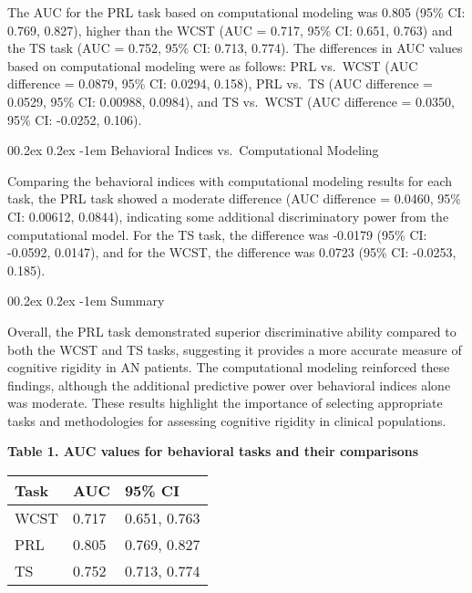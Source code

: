 \documentclass[
  man]{apa6}
\makeatletter
\let\oldparagraph\paragraph
\renewcommand{\paragraph}{
    \@ifstar
      \xxxParagraphStar
      \xxxParagraphNoStar
  }
\newcommand{\xxxParagraphStar}[1]{\oldparagraph*{#1}\mbox{}}
\newcommand{\xxxParagraphNoStar}[1]{\oldparagraph{#1}\mbox{}}
\renewcommand{\paragraph}{\@startsection{paragraph}{4}{\parindent}%
  {0\baselineskip \@plus 0.2ex \@minus 0.2ex}%
  {-1em}%
  {\normalfont\normalsize\bfseries\itshape\typesectitle}}
\makeatother
\begin{document}
The AUC for the PRL task based on computational modeling was 0.805 (95\% CI: 0.769, 0.827), higher than the WCST (AUC = 0.717, 95\% CI: 0.651, 0.763) and the TS task (AUC = 0.752, 95\% CI: 0.713, 0.774). The differences in AUC values based on computational modeling were as follows: PRL vs.~WCST (AUC difference = 0.0879, 95\% CI: 0.0294, 0.158), PRL vs.~TS (AUC difference = 0.0529, 95\% CI: 0.00988, 0.0984), and TS vs.~WCST (AUC difference = 0.0350, 95\% CI: -0.0252, 0.106).

\paragraph{Behavioral Indices vs.~Computational Modeling}\label{behavioral-indices-vs.-computational-modeling}

Comparing the behavioral indices with computational modeling results for each task, the PRL task showed a moderate difference (AUC difference = 0.0460, 95\% CI: 0.00612, 0.0844), indicating some additional discriminatory power from the computational model. For the TS task, the difference was -0.0179 (95\% CI: -0.0592, 0.0147), and for the WCST, the difference was 0.0723 (95\% CI: -0.0253, 0.185).

\paragraph{Summary}\label{summary}

Overall, the PRL task demonstrated superior discriminative ability compared to both the WCST and TS tasks, suggesting it provides a more accurate measure of cognitive rigidity in AN patients. The computational modeling reinforced these findings, although the additional predictive power over behavioral indices alone was moderate. These results highlight the importance of selecting appropriate tasks and methodologies for assessing cognitive rigidity in clinical populations.

\textbf{Table 1. AUC values for behavioral tasks and their comparisons}

\begin{longtable}[]{@{}lll@{}}
\toprule\noalign{}
Task & AUC & 95\% CI \\
\midrule\noalign{}
\endhead
\bottomrule\noalign{}
\endlastfoot
WCST & 0.717 & 0.651, 0.763 \\
PRL & 0.805 & 0.769, 0.827 \\
TS & 0.752 & 0.713, 0.774 \\
\end{longtable}
\end{document}
